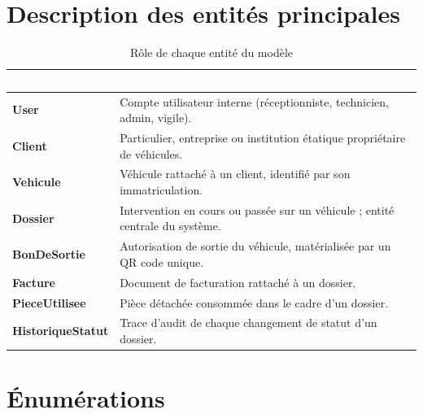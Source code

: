 \documentclass[11pt,a4paper]{report}
\begin{document}
\section{Description des entités principales}

\begin{table}[h!]
\centering
{}
\begin{tabularx}{\linewidth}{@{}l>{\raggedright\arraybackslash}X@{}}
\toprule
\rowcolor{km0blue}
\textcolor{white}{\textbf{Entité}} & \textcolor{white}{\textbf{Rôle}} \\
\midrule
\textbf{User} & Compte utilisateur interne (réceptionniste, technicien, admin, vigile). \\
\textbf{Client} & Particulier, entreprise ou institution étatique propriétaire de véhicules. \\
\textbf{Vehicule} & Véhicule rattaché à un client, identifié par son immatriculation. \\
\textbf{Dossier} & Intervention en cours ou passée sur un véhicule ; entité centrale du système. \\
\textbf{BonDeSortie} & Autorisation de sortie du véhicule, matérialisée par un QR code unique. \\
\textbf{Facture} & Document de facturation rattaché à un dossier. \\
\textbf{PieceUtilisee} & Pièce détachée consommée dans le cadre d'un dossier. \\
\textbf{HistoriqueStatut} & Trace d'audit de chaque changement de statut d'un dossier. \\
\bottomrule
\end{tabularx}
\caption{Rôle de chaque entité du modèle}
\end{table}

\section{Énumérations}
\end{document}
